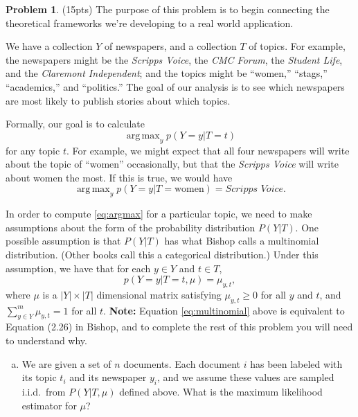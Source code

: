 \documentclass[10pt]{article}
\theoremstyle{definition}
\newtheorem{problem}{Problem}
\DeclareMathOperator*{\argmax}{arg\,max}
\begin{document}
\newpage
\begin{problem}
    (15pts) 
    The purpose of this problem is to begin connecting the theoretical frameworks we're developing to a real world application.

    We have a collection $Y$ of newspapers,
    and a collection $T$ of topics.
    For example, the newspapers might be the \emph{Scripps Voice}, the \emph{CMC Forum}, the \emph{Student Life}, and the \emph{Claremont Independent};
    and the topics might be ``women,'' ``stags,'' ``academics,'' and ``politics.'' 
    The goal of our analysis is to see which newspapers are most likely to publish stories about which topics.

    Formally, our goal is to calculate
    \begin{equation}
        \argmax_y p(Y=y|T=t)
        \label{eq:argmax}
    \end{equation}
    for any topic $t$.
    For example, we might expect that all four newspapers will write about the topic of ``women'' occasionally,
    but that the \emph{Scripps Voice} will write about women the most.
    If this is true, we would have 
    \begin{equation}
        \argmax_y p(Y=y|T=\text{women}) = \textit{Scripps Voice}
        .
    \end{equation}

    In order to compute \eqref{eq:argmax} for a particular topic,
    we need to make assumptions about the form of the probability distribution $P(Y|T)$.
    One possible assumption is that $P(Y|T)$ has what Bishop calls a multinomial distribution.
    (Other books call this a categorical distribution.)
    Under this assumption, we have that for each $y\in Y$ and $t\in T$,
    \begin{equation}
        p(Y=y|T=t,\mu) = \mu_{y,t},
        \label{eq:multinomial}
    \end{equation}
    where $\mu$ is a $|Y| \times |T|$ dimensional matrix satisfying $\mu_{y,t}\ge0$ for all $y$ and $t$, and $\sum_{y\in Y}^m\mu_{y,t}=1$ for all $t$.
    \textbf{Note:} Equation \eqref{eq:multinomial} above is equivalent to Equation (2.26) in Bishop,
    and to complete the rest of this problem you will need to understand why.

    \begin{enumerate}[(a)]
        \item 
            We are given a set of $n$ documents.
            Each document $i$ has been labeled with its topic $t_i$ and its newspaper $y_i$,
            and we assume these values are sampled i.i.d.\ from $P(Y|T,\mu)$ defined above.
            What is the maximum likelihood estimator for $\mu$?


\end{enumerate}
\end{problem}
\end{document}
